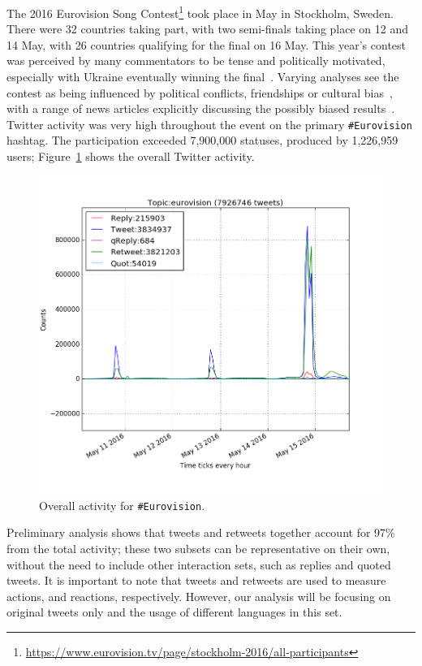 \documentclass{llncs}
\begin{document}
The 2016 Eurovision Song
Contest\footnote{\url{https://www.eurovision.tv/page/stockholm-2016/all-participants}}
took place in May in Stockholm, Sweden. There were 32 countries taking
part, with two semi-finals taking place on 12 and 14 May, with 26
countries qualifying for the final on 16 May. This year's contest was
perceived by many commentators to be tense and politically motivated,
especially with Ukraine eventually winning the
final~\cite{telegrapheuroboycott:2016}. Varying analyses see the
contest as being influenced by political conflicts, friendships or
cultural
bias~\cite{ginsburgh+noury:2008,charron:2013,blangiardo+baio:2014,budzinski+pannicke:2016},
with a range of news articles explicitly discussing the possibly
biased results~\cite{telegrapheurobias:2016}.  Twitter activity was
very high throughout the event on the primary {\texttt{\#Eurovision}}
hashtag. The participation exceeded 7,900,000 statuses, produced by
1,226,959 users; Figure~\ref{fig:overalleurovisionactivity} shows the
overall Twitter activity.

\begin{figure}[htb]
\centering
\includegraphics[width=\columnwidth]{images/overalleurovisionactivity.png}
\caption{Overall activity for {\texttt{\#Eurovision}}.}
\label{fig:overalleurovisionactivity}
\end{figure}

Preliminary analysis shows that tweets and retweets together account
for 97\% from the total activity; these two subsets can be
representative on their own, without the need to include other
interaction sets, such as replies and quoted tweets. It is important
to note that tweets and retweets are used to measure actions, and
reactions, respectively. However, our analysis will be focusing on
original tweets only and the usage of different languages in this set.
\end{document}
